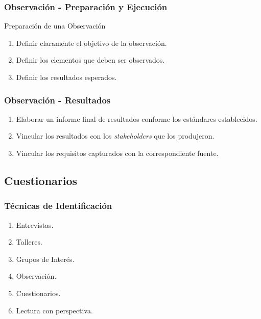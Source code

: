 ﻿\documentclass[handout,a4paper,slidestop,xcolor=pst,dvips,blue]{beamer}
\begin{document}
\begin{frame}[c]
    \frametitle{Observación - Preparación y Ejecución}
    \begin{block}{Preparación de una Observación}
        \begin{enumerate}
            \item<1-> Definir claramente el objetivo de la observación.
            \item<2-> Definir los elementos que deben ser observados.
            \item<3-> Definir los resultados esperados.
        \end{enumerate}
    \end{block}
\end{frame}

\begin{frame}[t]
    \frametitle{Observación - Resultados}
    \begin{enumerate}[<+->]
        \item Elaborar un informe final de resultados conforme los estándares establecidos.
        \item Vincular los resultados con los \emph{stakeholders} que los produjeron.
        \item Vincular los requisitos capturados con la correspondiente fuente.
    \end{enumerate}
\end{frame}

\subsection{Cuestionarios}

\begin{frame}[c]
    \frametitle{Técnicas de Identificación}
    \begin{enumerate}
         \item Entrevistas.
         \item Talleres.
         \item Grupos de Interés.
         \item Observación.
         \item \alert{Cuestionarios}.
         \item Lectura con perspectiva.
    \end{enumerate}
\end{frame}
\end{document}
